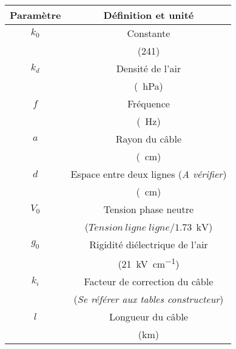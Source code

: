 \begin{center}
	\begin{tabular}{|c|c|}
		\hline 
		Paramètre & Définition et unité \\
		\hline
		$k_0$ & Constante \\
		& (241) \\
		\hline
		$k_d$ & Densité de l'air \\
		& (\SI[per-mode = symbol]{}{\hecto\pascal}) \\
		\hline
		$f$ & Fréquence \\ 
		& (\SI{}{\hertz}) \\
		\hline
		$a$ & Rayon du câble \\
		& (\SI{}{\cm}) \\
		\hline
		$d$ & Espace entre deux lignes (\emph{A vérifier}) \\
		& (\SI{}{\cm}) \\
		\hline
		$V_0$ & Tension phase neutre \\
		& ($Tension\ ligne\ ligne/1.73\ \SI{}{\kilo\volt}$) \\
		\hline
		$g_0$ & Rigidité diélectrique de l'air \\
		& (\SI[per-mode = symbol]{21}{\kilo\volt\per\cm}) \\
		\hline
		$k_i$ & Facteur de correction du câble \\
		& (\emph{Se référer aux tables constructeur}) \\
		\hline
		$l$ & Longueur du câble \\
		& (km) \\
		\hline
	\end{tabular}
\end{center}